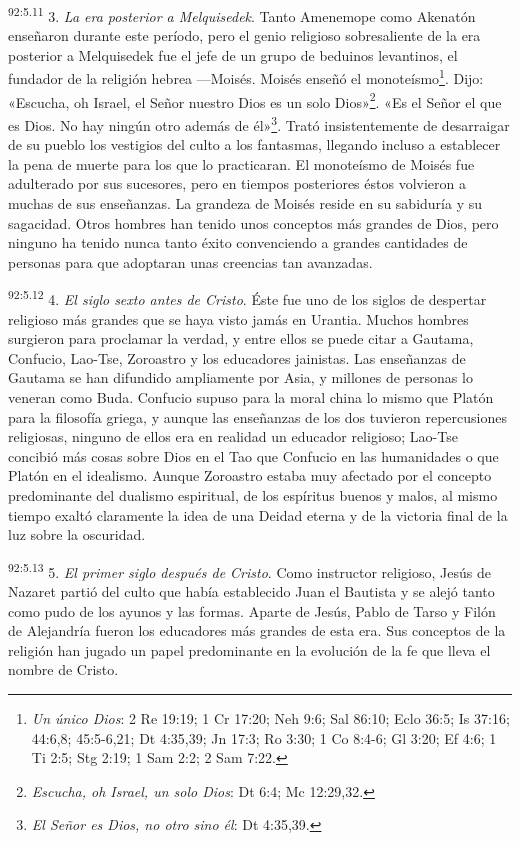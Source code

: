 \par
\textsuperscript{92:5.11} 3. \textit{La era posterior a Melquisedek}. Tanto Amenemope como Akenatón enseñaron durante este período, pero el genio religioso sobresaliente de la era posterior a Melquisedek fue el jefe de un grupo de beduinos levantinos, el fundador de la religión hebrea ---Moisés. Moisés enseñó el monoteísmo\footnote{\textit{Un único Dios}: 2 Re 19:19; 1 Cr 17:20; Neh 9:6; Sal 86:10; Eclo 36:5; Is 37:16; 44:6,8; 45:5-6,21; Dt 4:35,39; Jn 17:3; Ro 3:30; 1 Co 8:4-6; Gl 3:20; Ef 4:6; 1 Ti 2:5; Stg 2:19; 1 Sam 2:2; 2 Sam 7:22.}. Dijo: «Escucha, oh Israel, el Señor nuestro Dios es un solo Dios»\footnote{\textit{Escucha, oh Israel, un solo Dios}: Dt 6:4; Mc 12:29,32.}. «Es el Señor el que es Dios. No hay ningún otro además de él»\footnote{\textit{El Señor es Dios, no otro sino él}: Dt 4:35,39.}. Trató insistentemente de desarraigar de su pueblo los vestigios del culto a los fantasmas, llegando incluso a establecer la pena de muerte para los que lo practicaran. El monoteísmo de Moisés fue adulterado por sus sucesores, pero en tiempos posteriores éstos volvieron a muchas de sus enseñanzas. La grandeza de Moisés reside en su sabiduría y su sagacidad. Otros hombres han tenido unos conceptos más grandes de Dios, pero ninguno ha tenido nunca tanto éxito convenciendo a grandes cantidades de personas para que adoptaran unas creencias tan avanzadas.

\par
\textsuperscript{92:5.12} 4. \textit{El siglo sexto antes de Cristo}. Éste fue uno de los siglos de despertar religioso más grandes que se haya visto jamás en Urantia. Muchos hombres surgieron para proclamar la verdad, y entre ellos se puede citar a Gautama, Confucio, Lao-Tse, Zoroastro y los educadores jainistas. Las enseñanzas de Gautama se han difundido ampliamente por Asia, y millones de personas lo veneran como Buda. Confucio supuso para la moral china lo mismo que Platón para la filosofía griega, y aunque las enseñanzas de los dos tuvieron repercusiones religiosas, ninguno de ellos era en realidad un educador religioso; Lao-Tse concibió más cosas sobre Dios en el Tao que Confucio en las humanidades o que Platón en el idealismo. Aunque Zoroastro estaba muy afectado por el concepto predominante del dualismo espiritual, de los espíritus buenos y malos, al mismo tiempo exaltó claramente la idea de una Deidad eterna y de la victoria final de la luz sobre la oscuridad.

\par
\textsuperscript{92:5.13} 5. \textit{El primer siglo después de Cristo}. Como instructor religioso, Jesús de Nazaret partió del culto que había establecido Juan el Bautista y se alejó tanto como pudo de los ayunos y las formas. Aparte de Jesús, Pablo de Tarso y Filón de Alejandría fueron los educadores más grandes de esta era. Sus conceptos de la religión han jugado un papel predominante en la evolución de la fe que lleva el nombre de Cristo.

